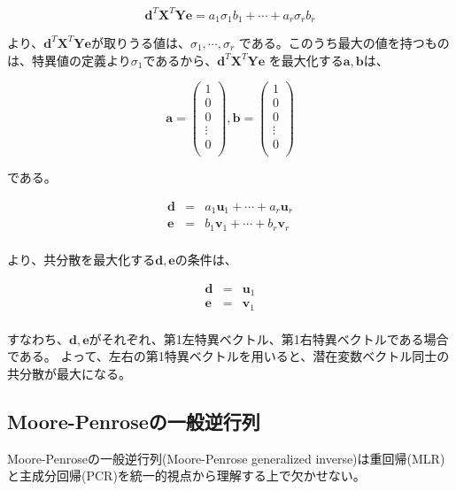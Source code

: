 \[
{\mathbf d}^T{\mathbf X}^T{\mathbf Y}{\mathbf e}  = a_1 \sigma_1 b_1 + \cdots + a_r \sigma_r b_r 
\]


より、\({\mathbf d}^T{\mathbf X}^T{\mathbf Y}{\mathbf e}\)が取りうる値は、\(\sigma_1 , \cdots , \sigma_r\) である。このうち最大の値を持つものは、特異値の定義より\(\sigma_1\)であるから、\({\mathbf d}^T{\mathbf X}^T{\mathbf Y}{\mathbf e}\) を最大化する\({\mathbf a}, {\mathbf b}\)は、

\[
{\mathbf a}
=
\left(
\begin{array}{c}
1 \\
0 \\
0 \\
\vdots \\
0\\
\end{array}
\right)
, 
{\mathbf b}
=
\left(
\begin{array}{c}
1 \\
0 \\
0 \\
\vdots \\
0\\
\end{array}
\right)
\]

である。

\begin{eqnarray*}
{\mathbf d} & = & a_1 {\mathbf u}_1 + \cdots + a_r {\mathbf u}_r \\
{\mathbf e} & = & b_1 {\mathbf v}_1 + \cdots + b_r {\mathbf v}_r \\
\end{eqnarray*}

より、共分散を最大化する\({\mathbf d}, {\mathbf e}\)の条件は、

\begin{eqnarray*}
{\mathbf d} & = & {\mathbf u}_1 \\
{\mathbf e} & = & {\mathbf v}_1 \\
\end{eqnarray*}

すなわち、\({\mathbf d}, {\mathbf e}\)がそれぞれ、第1左特異ベクトル、第1右特異ベクトルである場合である。
\indent よって、左右の第1特異ベクトルを用いると、潜在変数ベクトル同士の共分散が最大になる。

\subsection{Moore-Penroseの一般逆行列}
Moore-Penroseの一般逆行列(Moore-Penrose generalized inverse)は重回帰(MLR)と主成分回帰(PCR)を統一的視点から理解する上で欠かせない。

